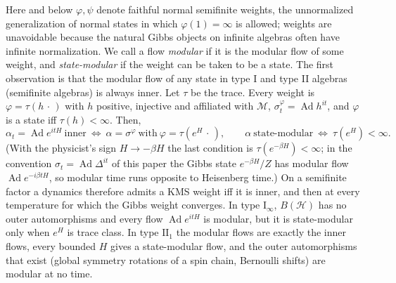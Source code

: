 \documentclass[a4paper,11pt]{article}
\newtheorem{theorem}{Theorem}
\theoremstyle{definition}
\begin{document}
Here and below $\varphi,\psi$ denote faithful normal semifinite weights, the unnormalized generalization of normal states in which $\varphi(1)=\infty$ is allowed; weights are unavoidable because the natural Gibbs objects on infinite algebras often have infinite normalization. We call a flow \emph{modular} if it is the modular flow of some weight, and \emph{state-modular} if the weight can be taken to be a state.
The first observation is that the modular flow of any state in type I and type II algebras (semifinite algebras) is always inner. Let $\tau$ be the trace. Every weight is $\varphi=\tau(h\,\cdot\,)$ with $h$ positive, injective and affiliated with $\mathcal M$, $\sigma^\varphi_t=\operatorname{Ad}h^{it}$, and $\varphi$ is a state iff $\tau(h)<\infty$. Then,
\begin{equation}
 \alpha_t=\operatorname{Ad}e^{itH}\ \text{inner}
 \ \Longleftrightarrow\ \alpha=\sigma^{\varphi}\ \text{with}\ \varphi=\tau(e^{H}\,\cdot\,),
 \qquad
 \alpha\ \text{state-modular}\ \Longleftrightarrow\ \tau(e^{H})<\infty .
 \label{eq:semifinite-dictionary}
\end{equation}
(With the physicist's sign $H\to-\beta H$ the last condition is $\tau(e^{-\beta H})<\infty$; in the convention $\sigma_t=\operatorname{Ad}\Delta^{it}$ of this paper the Gibbs state $e^{-\beta H}/Z$ has modular flow $\operatorname{Ad}e^{-i\beta tH}$, so modular time runs opposite to Heisenberg time.) On a semifinite factor a dynamics therefore admits a KMS weight iff it is inner, and then at every temperature for which the Gibbs weight converges. In type $\mathrm I_\infty$, $B(\mathcal H)$ has no outer automorphisms and every flow $\operatorname{Ad}e^{itH}$ is modular, but it is state-modular only when $e^{H}$ is trace class. In type $\mathrm{II}_1$ the modular flows are exactly the inner flows, every bounded $H$ gives a state-modular flow, and the outer automorphisms that exist (global symmetry rotations of a spin chain, Bernoulli shifts) are modular at no time.%
\end{document}
